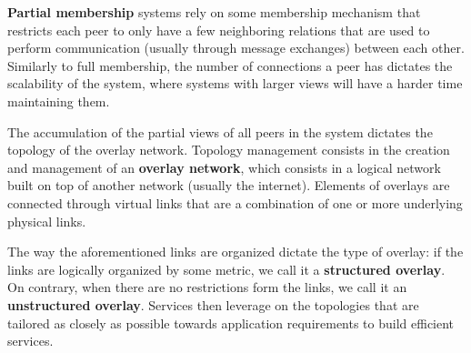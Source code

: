 \textbf{Partial membership} systems rely on some membership mechanism that restricts each peer to only have a few neighboring relations that are used to perform communication (usually through message exchanges) between each other. Similarly to full membership, the number of connections a peer has  dictates the scalability of the system, where systems with larger views will have a harder time maintaining them. 

The accumulation of the partial views of all peers in the system dictates the topology of the overlay network. Topology management consists in the creation and management of an \textbf{overlay network}, which consists in a logical network built on top of another network (usually the internet). Elements of overlays are connected through virtual links that are a combination of one or more underlying physical links.

The way the aforementioned links are organized dictate the type of overlay: if the links are logically organized by some metric, we call it a \textbf{structured overlay}. On contrary, when there are no restrictions form the links, we call it an \textbf{unstructured overlay}. Services then leverage on the topologies that are tailored as closely as possible towards application requirements to build efficient services.

